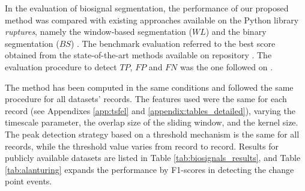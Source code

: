 In the evaluation of biosignal segmentation, the performance of our proposed method was compared with existing approaches available on the Python library \textit{ruptures}, namely the window-based segmentation ($WL$) and the binary segmentation ($BS$) \cite{review_2}. The benchmark evaluation referred to the best score obtained from the state-of-the-art methods available on repository  \cite{cpd_alan}. The evaluation procedure to detect $TP$, $FP$ and $FN$ was the one followed on \cite{cpd_alan}.

The method has been computed in the same conditions and followed the same procedure for all datasets' records. The features used were the same for each record (see Appendixes \ref{app:tsfel} and  \ref{appendix:tables_detailed}), varying the timescale parameter, the overlap size of the sliding window, and the kernel size. The peak detection strategy based on a threshold mechanism is the same for all records, while the threshold value varies from record to record. Results for publicly available datasets are listed in Table \ref{tab:biosignals_results}, and Table \ref{tab:alanturing} expands the performance by F1-scores in detecting the change point events.

